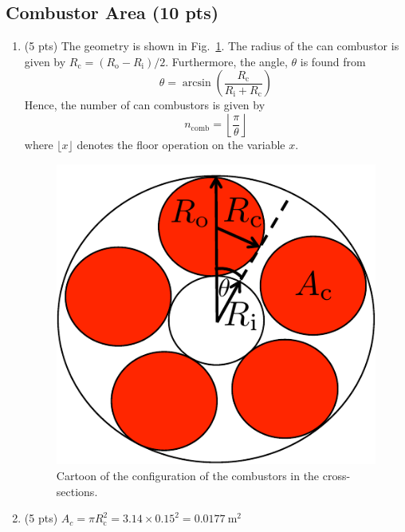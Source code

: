 \documentclass[12pt]{article}
\begin{document}
	\subsection{Combustor Area (10 pts)}
	\begin{enumerate}[label=(\alph*)]
		\item (5 pts)
			The geometry is shown in Fig.~\ref{FIG_2pt2}. The radius of the can combustor is given by $R_\mathrm{c}=(R_\mathrm{o}-R_\mathrm{i})/2$. Furthermore, the angle, $\theta$ is found from 
			\begin{equation}
				\theta = \arcsin\left(\frac{R_\mathrm{c}}{R_\mathrm{i}+R_\mathrm{c}}\right)
			\end{equation} 
			Hence, the number of can combustors is given by
			\begin{equation}
				n_\mathrm{comb} =\boxed{\left\lfloor{\frac{\pi}{\theta}}\right\rfloor}
			\end{equation}
			where $\lfloor x\rfloor$ denotes the floor operation on the variable $x$. 
			\begin{figure}[!t!]
				\begin{center}
					\includegraphics[width=120mm]{problem2pt2.pdf}
					\caption{\label{FIG_2pt2} Cartoon of the configuration of the combustors in the cross-sections.}
				\end{center}
			\end{figure}
		\item (5 pts)
			$A_c=\pi R_\mathrm{c}^2=3.14\times0.15^2=\boxed{0.0177\ \mathrm{m^2}}$
	\end{enumerate}
\end{document}
